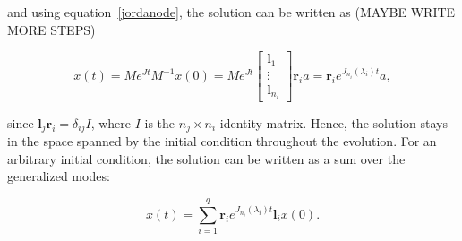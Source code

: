 \documentclass[../main.tex]{subfiles}
\begin{document}
and using equation~\eqref{jordanode}, the solution can be written as (MAYBE WRITE MORE STEPS)

\begin{equation}\label{genmode}
    x(t) = Me^{Jt}M^{-1}x(0) = Me^{Jt} \begin{bmatrix} \boldsymbol{l}_1 \\ \vdots \\ \boldsymbol{l}_{n_i} \end{bmatrix} \boldsymbol{r}_ia = \boldsymbol{r}_i e^{J_{n_i}(\lambda_i)t} a,
\end{equation}

since $\boldsymbol{l}_j\boldsymbol{r}_i = \delta_{ij}I$, where $I$ is the $n_j\times n_i$ identity matrix. Hence, the solution stays in the space spanned by the initial condition throughout the evolution. For an arbitrary initial condition, the solution can be written as a sum over the generalized modes: 

\begin{equation}
    x(t) = \sum_{i=1}^q \boldsymbol{r}_i e^{J_{n_i}(\lambda_i)t} \boldsymbol{l}_i x(0).
\end{equation}
\end{document}

